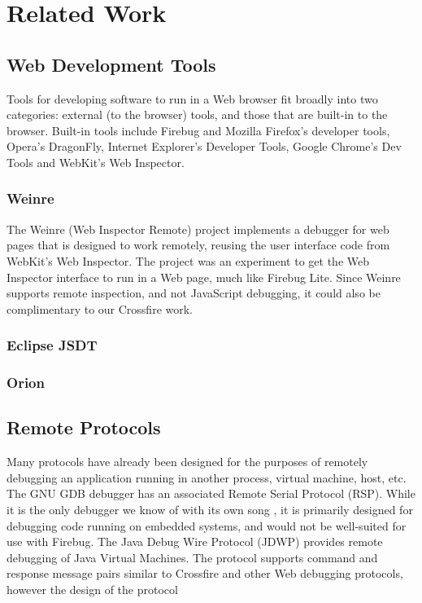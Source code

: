 
\section{Related Work}
\subsection{Web Development Tools}
Tools for developing software to run in a Web browser fit broadly into two
categories: external (to the
browser) tools, and those that are built-in to the browser.
Built-in tools include Firebug and Mozilla Firefox's developer tools,
Opera's DragonFly, Internet Explorer's Developer Tools, Google Chrome's Dev
Tools and WebKit's Web Inspector.

\subsubsection{Weinre}
The Weinre (Web Inspector Remote)\cite{weinre} project implements a debugger for
web pages that is designed to work remotely, reusing the user interface code
from WebKit's Web Inspector. The project was an experiment to get the Web
Inspector interface to run in a Web page, much like Firebug Lite. Since Weinre
supports remote inspection, and not JavaScript debugging, it could also be complimentary
to our Crossfire work.

\subsubsection{Eclipse JSDT}

\subsubsection{Orion}

\subsection{Remote Protocols}
Many protocols have already been designed for the purposes of remotely debugging
an application running in another process, virtual machine, host, etc. The GNU
GDB debugger has an associated Remote Serial Protocol (RSP)\cite{gdb-rsp}. While
it is the only debugger we know of with its own song \cite{gdb-song}, it is
primarily designed for debugging code running on embedded systems, and would not
be well-suited for use with Firebug. The Java Debug Wire Protocol (JDWP)
\cite{jdwp} provides remote debugging of Java Virtual Machines. The protocol
supports command and response message pairs similar to Crossfire and other Web
debugging protocols, however the design of the protocol
